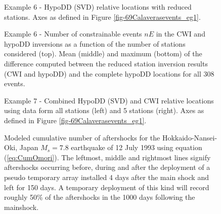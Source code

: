 \documentclass[12pt,double]{article}
\begin{document}

\begin{figure}
\caption{Example 6 - HypoDD (SVD) relative locations with reduced
stations. Axes as defined in Figure \ref{fig-69Calaverasevents_eg1}. 
\hspace{20em} }
\label{fig-HYPODDreducesstats}
\end{figure}


\begin{figure}
\caption{Example 6 - Number of constrainable events $nE$ in the CWI
and hypoDD inversions as a function of the number of stations considered
(top). Mean (middle) and maximum (bottom) of the difference computed
between the reduced station inversion results (CWI and hypoDD) and
the complete hypoDD locations for all 308 events. }
\label{fig-statremoval_summarystats}
\end{figure}



\begin{figure}
\caption{Example 7 - Combined HypoDD (SVD) and CWI relative
locations using data form all stations (left) and 5 stations
(right). Axes as defined in Figure \ref{fig-69Calaverasevents_eg1}.} 
\label{fig-68Calaverasevents_ttandcoda1}
\end{figure}




\begin{figure}
\caption{Modeled cumulative number of aftershocks for the
Hokkaido-Nansei-Oki, Japan $M_s=7.8$ earthquake of 12 July 1993
using equation (\ref{eq:CumOmori}). The leftmost, middle
and rightmost lines signify aftershocks occurring before, during
and after the deployment of a pseudo temporary array installed 4
days after the main shock and left for 150 days. A temporary
deployment of this kind will record roughly 50\% of the aftershocks
in the 1000 days following the mainshock. } \label{fig:Omorifigure}
\end{figure}
\end{document}
